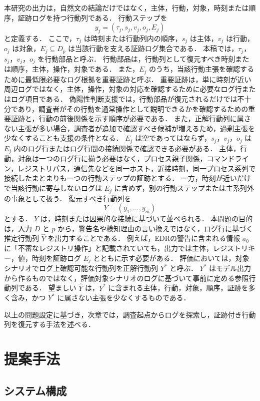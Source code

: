 \documentclass[a4paper,twocolumn,10pt]{article}
\begin{document}
本研究の出力は，自然文の結論だけではなく，主体，行動，対象，時刻または順序，証跡ログを持つ行動列である．
行動ステップを
\[
y_j=(\tau_j,s_j,v_j,o_j,E_j)
\]
と定義する．
ここで，\(\tau_j\) は時刻または行動列内の順序，\(s_j\) は主体，\(v_j\) は行動，\(o_j\) は対象，\(E_j\subseteq D_p\) は当該行動を支える証跡ログ集合である．
本稿では，\(\tau_j\)，\(s_j\)，\(v_j\)，\(o_j\) を行動部品と呼ぶ．
行動部品は，行動列として復元すべき時刻または順序，主体，操作，対象である．
また，\(E_j\) のうち，当該行動主張を確認するために最低限必要なログ根拠を重要証跡と呼ぶ．
重要証跡は，単に時刻が近い周辺ログではなく，主体，操作，対象の対応を確認するために必要なログ行またはログ項目である．
偽陽性判断支援では，行動部品が復元されるだけでは不十分であり，調査者がその行動を通常操作として説明できるかを確認するための重要証跡と，行動の前後関係を示す順序が必要である．
また，正解行動列に属さない主張が多い場合，調査者が追加で確認すべき候補が増えるため，過剰主張を少なくすることも支援の条件となる．
\(E_j\) は空であってはならず，\(s_j\)，\(v_j\)，\(o_j\) は \(E_j\) 内のログ行またはログ行間の接続関係で確認できる必要がある．
主体，行動，対象は一つのログ行に揃う必要はなく，プロセス親子関係，コマンドライン，レジストリパス，通信先などを同一ホスト，近接時刻，同一プロセス系列で接続したまとまりも一つの行動ステップの証跡とする．
一方，時刻が近いだけで当該行動に寄与しないログは \(E_j\) に含めず，別の行動ステップまたは主系列外の事象として扱う．
復元すべき行動列を
\[
Y=(y_1,\ldots,y_m)
\]
とする．
\(Y\) は，時刻または因果的な接続に基づいて並べられる．
本問題の目的は，入力 \(D\) と \(p\) から，警告名や検知理由の言い換えではなく，ログ行に基づく推定行動列 \(\hat{Y}\) を出力することである．
例えば，EDRの警告に含まれる情報 \(a_0\) に「不審なレジストリ操作」と記載されていても，出力では主体，レジストリキー，値，時刻を証跡ログ \(E_j\) とともに示す必要がある．
評価においては，対象シナリオでログ上確認可能な行動列を正解行動列 \(Y^\ast\) と呼ぶ．
\(Y^\ast\) はモデル出力から作るものではなく，評価対象シナリオのログに基づいて事前に定める参照行動列である．
望ましい \(\hat{Y}\) は，\(Y^\ast\) に含まれる主体，行動，対象，順序，証跡を多く含み，かつ \(Y^\ast\) に属さない主張を少なくするものである．

以上の問題設定に基づき，次章では，調査起点からログを探索し，証跡付き行動列を復元する手法を述べる．

\section{提案手法}

\subsection{システム構成}
\end{document}
